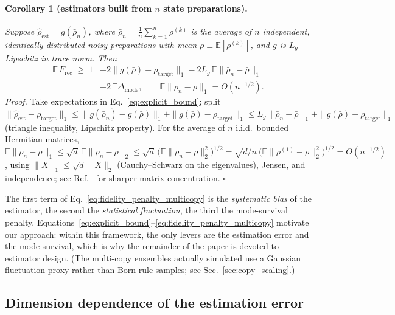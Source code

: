 \documentclass[pra,twocolumn,superscriptaddress,longbibliography,floatfix,nofootinbib]{revtex4-2}
\newcommand{\Frec}{F_\mathrm{rec}}
\newcommand{\rhot}{\rho_\mathrm{target}}
\newcommand{\rhoe}{\hat{\rho}_\mathrm{est}}
\begin{document}
\paragraph{Corollary 1 (estimators built from $n$ state preparations).}
\textit{Suppose $\rhoe = g(\bar\rho_n)$, where $\bar\rho_n = \tfrac1n\sum_{k=1}^n \rho^{(k)}$ is the average of $n$ independent, identically distributed noisy preparations with mean $\bar\rho \equiv \mathbb{E}[\rho^{(k)}]$, and $g$ is $L_g$-Lipschitz in trace norm. Then}
\begin{equation}
\begin{split}
\mathbb{E}\,\Frec \;\geq\; 1 &- 2\bigl\|g(\bar\rho) - \rhot\bigr\|_1 - 2L_g\,\mathbb{E}\|\bar\rho_n - \bar\rho\|_1 \\
 &- 2\,\mathbb{E}\Delta_{\mathrm{mode}},
\qquad \mathbb{E}\|\bar\rho_n - \bar\rho\|_1 = O(n^{-1/2}).
\end{split}
\label{eq:fidelity_penalty_multicopy}
\end{equation}
\noindent\textit{Proof.}
Take expectations in Eq.~\eqref{eq:explicit_bound}; split $\|\rhoe - \rhot\|_1 \leq \|g(\bar\rho_n) - g(\bar\rho)\|_1 + \|g(\bar\rho) - \rhot\|_1 \leq L_g\|\bar\rho_n - \bar\rho\|_1 + \|g(\bar\rho) - \rhot\|_1$ (triangle inequality, Lipschitz property).
For the average of $n$ i.i.d.\ bounded Hermitian matrices, $\mathbb{E}\|\bar\rho_n - \bar\rho\|_1 \leq \sqrt{d}\,\mathbb{E}\|\bar\rho_n - \bar\rho\|_2 \leq \sqrt{d}\,\bigl(\mathbb{E}\|\bar\rho_n - \bar\rho\|_2^2\bigr)^{1/2} = \sqrt{d/n}\,\bigl(\mathbb{E}\|\rho^{(1)} - \bar\rho\|_2^2\bigr)^{1/2} = O(n^{-1/2})$, using $\|X\|_1 \leq \sqrt{d}\|X\|_2$ (Cauchy--Schwarz on the eigenvalues), Jensen, and independence; see Ref.~\cite[Sec.~1]{Tropp2015} for sharper matrix concentration. \hfill$\square$

The first term of Eq.~\eqref{eq:fidelity_penalty_multicopy} is the \emph{systematic bias} of the estimator, the second the \emph{statistical fluctuation}, the third the mode-survival penalty.
Equations~\eqref{eq:explicit_bound}--\eqref{eq:fidelity_penalty_multicopy} motivate our approach: within this framework, the only levers are the estimation error and the mode survival, which is why the remainder of the paper is devoted to estimator design.
(The multi-copy ensembles actually simulated use a Gaussian fluctuation proxy rather than Born-rule samples; see Sec.~\ref{sec:copy_scaling}.)

\subsection{Dimension dependence of the estimation error}
\label{sec:crossover_theory}
\end{document}
